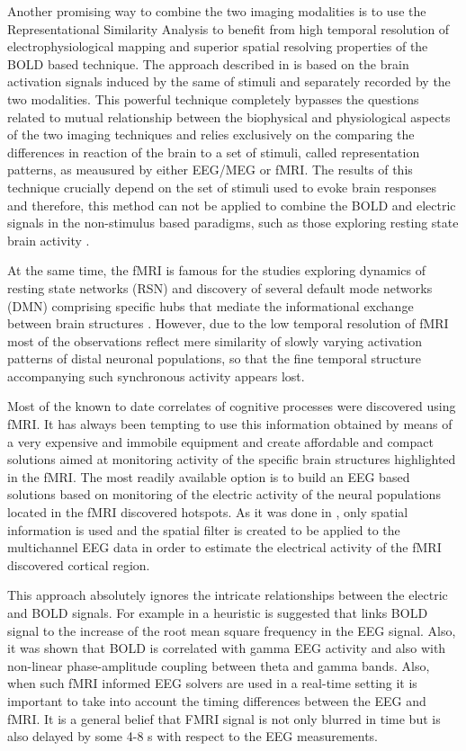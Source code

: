 \documentclass{article}
\begin{document}
Another promising way to combine the two imaging modalities is to use the Representational Similarity Analysis \cite{rsa} to benefit from high temporal resolution of electrophysiological mapping and superior spatial resolving properties of the BOLD based technique. The approach described in \cite{cichy} is based on the brain activation signals induced by the same of stimuli and separately recorded by the two modalities. This powerful technique completely bypasses the questions related to mutual relationship between the biophysical and physiological aspects of the two imaging techniques and relies exclusively on the comparing the differences in reaction of the brain to a set of stimuli, called representation patterns, as meausured by either EEG/MEG or fMRI.  The results of this technique crucially depend on the set of stimuli used to evoke brain responses and therefore, this method can not be applied to combine the BOLD and electric signals in the non-stimulus based paradigms, such as those exploring resting state brain activity \cite{restingstate}.

At the same time, the fMRI is famous for the studies exploring dynamics of resting state networks (RSN) and discovery of several default mode networks (DMN) comprising specific hubs that mediate the informational exchange between brain structures \cite{rsnfmri}.  However, due to the low temporal resolution of fMRI  most of the observations reflect mere similarity of slowly varying activation patterns of distal neuronal populations, so that the fine temporal structure accompanying such synchronous activity appears lost.  

Most of the known to date correlates of cognitive processes were discovered using fMRI. It has always been tempting to use this information obtained by means of a very expensive and immobile equipment and create affordable and compact solutions aimed at monitoring activity of the specific brain structures highlighted in the fMRI. The most readily available option is to build an EEG based solutions based on monitoring of the electric activity of the neural populations located in the fMRI discovered hotspots. As it was done in \cite{medi}, only spatial information is used and the spatial filter is created to be applied to the multichannel EEG data in order to estimate the electrical activity of the fMRI discovered cortical region.

This approach absolutely ignores the intricate relationships between the electric and  BOLD signals. For example in \cite{hemoeeg} a heuristic is suggested that links BOLD signal to the increase of the root mean square frequency in the EEG signal. Also, it was shown that BOLD is correlated with gamma EEG activity and also with non-linear phase-amplitude coupling between theta and gamma bands. Also, when such fMRI informed EEG solvers are used in a real-time setting it is important to take into account the timing differences between the EEG and fMRI. It is a general belief that  FMRI signal is not only blurred  in time  but is also delayed by some 4-8 s with respect to the EEG measurements.   
\end{document}
